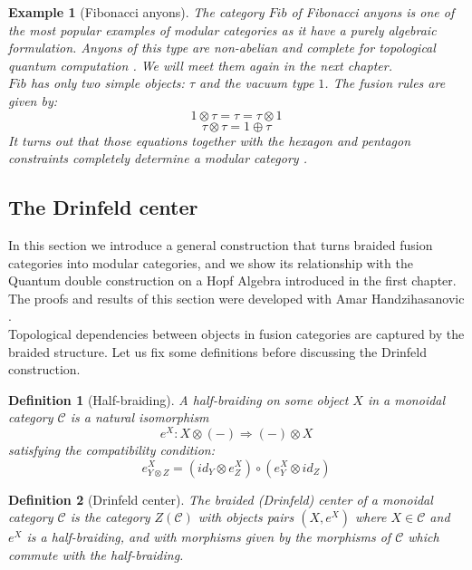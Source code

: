 \documentclass{article}
\newtheorem{definition}{Definition}
\newtheorem{example}{Example}
\newcommand{\cat}{\mathcal{C}}
\begin{document}
\begin{example}[Fibonacci anyons]
	The category $Fib$ of Fibonacci anyons is one of the most popular examples of modular categories as it have a purely algebraic formulation. Anyons of this type are non-abelian and complete for topological quantum computation \cite{Panangaden11}. We will meet them again in the next chapter.\\
	$Fib$ has only two simple objects: $\tau$ and the vacuum type $1$. The fusion rules are given by:
	$$ 1 \otimes \tau = \tau = \tau \otimes 1$$
	$$ \tau \otimes \tau = 1 \oplus \tau $$ 
	It turns out that those equations together with the hexagon and pentagon constraints completely determine a modular category \cite{Simon16}.
\end{example}


\subsection{The Drinfeld center}
In this section we introduce a general construction that turns braided fusion categories into modular categories, and we show its relationship with the Quantum double construction on a Hopf Algebra introduced in the first chapter.
The proofs and results of this section were developed with Amar Handzihasanovic \cite{Handzihasanovic}.\\
Topological dependencies between objects in fusion categories are captured by the braided structure. Let us fix some definitions before discussing the Drinfeld construction.
\begin{definition}[Half-braiding]
	A half-braiding on some object $X$ in a monoidal category $\cat$ is a natural isomorphism 
	$$ e^X : X \otimes (-) \Rightarrow (-) \otimes X$$
	satisfying the compatibility condition:
	$$e^X_{Y \otimes Z} = (id_Y \otimes e^X_Z) \circ ( e^X_Y \otimes id_Z) $$ 
\end{definition}
\begin{definition}[Drinfeld center]
	The braided (Drinfeld) center of a monoidal category $\mathcal{C}$ is the category $Z(\mathcal{C})$ with objects pairs $(X,e^X)$ where $X \in \mathcal{C}$ and $e^X$ is a half-braiding, and with morphisms given by the morphisms of $\mathcal{C}$ which commute with the half-braiding.
\end{definition}
\end{document}
